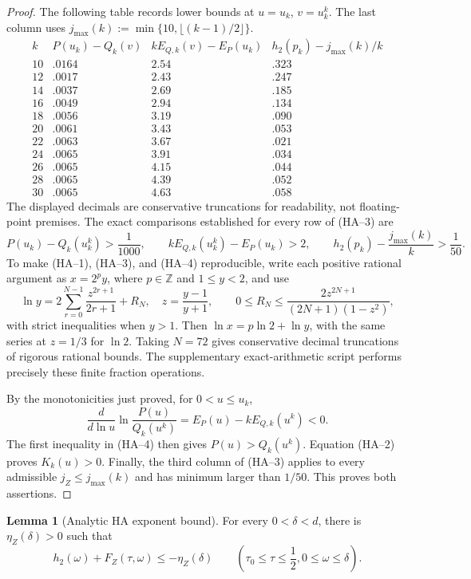 \documentclass[11pt]{article}
\theoremstyle{definition}
\newtheorem{lemma}[theorem]{Lemma}
\newcommand{\h}{h_2}
\begin{document}
\begin{proof}
The following table records lower bounds at \(u=u_k\), \(v=u_k^k\).
The last column uses
\(j_{\max}(k):=\min\{10,\lfloor(k-1)/2\rfloor\}\).
\[
\begin{array}{c|ccc}
k&P(u_k)-Q_k(v)&kE_{Q,k}(v)-E_P(u_k)&
 \h(p_k)-j_{\max}(k)/k\\ \hline
10&.0164&2.54&.323\\
12&.0017&2.43&.247\\
14&.0037&2.69&.185\\
16&.0049&2.94&.134\\
18&.0056&3.19&.090\\
20&.0061&3.43&.053\\
22&.0063&3.67&.021\\
24&.0065&3.91&.034\\
26&.0065&4.15&.044\\
28&.0065&4.39&.052\\
30&.0065&4.63&.058
\end{array}                                                     \tag{HA--3}
\]
The displayed decimals are conservative truncations for readability, not
floating-point premises.  The exact comparisons established for every row
of (HA--3) are
\[
 P(u_k)-Q_k(u_k^k)>\frac1{1000},\qquad
 kE_{Q,k}(u_k^k)-E_P(u_k)>2,
 \qquad
 \h(p_k)-\frac{j_{\max}(k)}k>\frac1{50}.       \tag{HA--4}
\]
To make (HA--1), (HA--3), and (HA--4) reproducible, write each positive
rational argument as \(x=2^py\), where \(p\in\mathbb Z\) and
\(1\le y<2\), and use
\[
 \ln y=2\sum_{r=0}^{N-1}\frac{z^{2r+1}}{2r+1}+R_N,
 \quad z=\frac{y-1}{y+1},\qquad
 0\le R_N\le\frac{2z^{2N+1}}{(2N+1)(1-z^2)},
\]
with strict inequalities when \(y>1\).  Then
\(\ln x=p\ln2+\ln y\), with the same series at \(z=1/3\) for
\(\ln2\).  Taking \(N=72\) gives conservative decimal truncations of rigorous
rational bounds.  The
supplementary exact-arithmetic script performs precisely these finite
fraction operations.

By the monotonicities just proved, for \(0<u\le u_k\),
\[
 \frac{d}{d\ln u}\ln\frac{P(u)}{Q_k(u^k)}
 =E_P(u)-kE_{Q,k}(u^k)<0.
\]
The first inequality in (HA--4) then gives \(P(u)>Q_k(u^k)\).  Equation (HA--2)
proves \(K_k(u)>0\).  Finally, the third column of (HA--3) applies to every
admissible \(j_Z\le j_{\max}(k)\) and has minimum larger than \(1/50\).
This proves both assertions.
\end{proof}

\begin{lemma}[Analytic HA exponent bound]\label{lem:finite-gv-ha-neg-jp}
For every \(0<\delta<d\), there is \(\eta_Z(\delta)>0\) such that
\[
\h(\omega)+F_Z(\tau,\omega)\le-\eta_Z(\delta)
\qquad
\left(\tau_0\le\tau\le\frac12, 0\le\omega\le\delta\right).
\]
\end{lemma}
\end{document}
